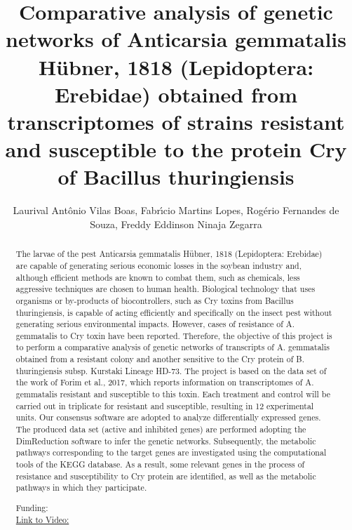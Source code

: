 \documentclass[twoside]{article}
\title{\vspace{-15mm}\fontsize{24pt}{10pt}\selectfont\textbf{ Comparative analysis of genetic networks of Anticarsia gemmatalis H\"ubner,  1818 (Lepidoptera: Erebidae) obtained from transcriptomes of strains resistant and susceptible to the protein Cry of Bacillus thuringiensis }} %
\author{ Laurival Ant\^onio Vilas Boas,  Fabr\'{\i}cio Martins Lopes,  Rog\'erio Fernandes de Souza,  Freddy Eddinson Ninaja Zegarra }
\affil{ Universidade Tecnol\'ogica Federal do Paran\'a (UTFPR) }
\date{}
\begin{document}
  
  
  \maketitle %
  
  
  \thispagestyle{fancy} %
  
  
  \begin{abstract}
  The larvae of the pest Anticarsia gemmatalis H\"ubner,  1818 (Lepidoptera: Erebidae) are capable of generating serious economic losses in the soybean industry and,  although efficient methods are known to combat them,  such as chemicals,  less aggressive techniques are chosen to human health. Biological technology that uses organisms or by-products of biocontrollers,  such as Cry toxins from Bacillus thuringiensis,  is capable of acting efficiently and specifically on the insect pest without generating serious environmental impacts. However,  cases of resistance of A. gemmatalis to Cry toxin have been reported. Therefore,  the objective of this project is to perform a comparative analysis of genetic networks of transcripts of A. gemmatalis obtained from a resistant colony and another sensitive to the Cry protein of B. thuringiensis subsp. Kurstaki Lineage HD-73. The project is based on the data set of the work of Forim et al.,  2017,  which reports information on transcriptomes of A. gemmatalis resistant and susceptible to this toxin. Each treatment and control will be carried out in triplicate for resistant and susceptible,  resulting in 12 experimental units. Our consensus software are adopted to analyze differentially expressed genes. The produced data set (active and inhibited genes) are performed adopting the DimReduction software to infer the genetic networks. Subsequently,  the metabolic pathways corresponding to the target genes are investigated using the computational tools of the KEGG database. As a result,  some relevant genes in the process of resistance and susceptibility to Cry protein are identified,  as well as the metabolic pathways in which they participate.
  
  Funding:   \\
  \href{http://ab3c.org.br/xpress_pres2020/xmxp2020-303479.html}{Link to Video:}

  \end{abstract}
   
  
\end{document}
